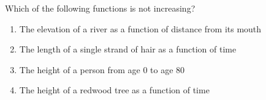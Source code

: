 \bigskip

\item Which of the following functions is not increasing?

\begin{enumerate}
\item The elevation of a river as a function of distance from its mouth
\item The length of a single strand of hair as a function of time
\item The height of a person from age 0 to age 80
\item The height of a redwood tree as a function of time
\end{enumerate}


